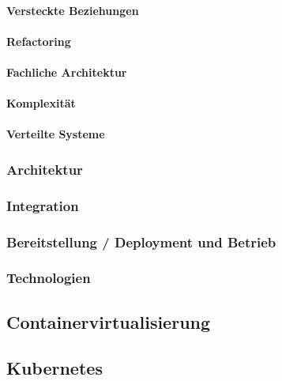 \paragraph{Versteckte Beziehungen}

\paragraph{Refactoring}

\paragraph{Fachliche Architektur}

\paragraph{Komplexität}

\paragraph{Verteilte Systeme}

\subsubsection{Architektur}

\subsubsection{Integration}

\subsubsection{Bereitstellung / Deployment und Betrieb}

\subsubsection{Technologien}

\subsection{Containervirtualisierung}

\subsection{Kubernetes}
